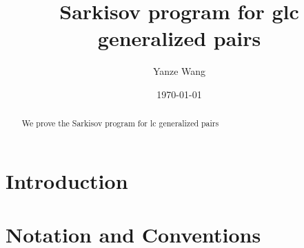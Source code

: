 \documentclass[11pt]{amsart}
\numberwithin{equation}{section}
\theoremstyle{definition}
\theoremstyle{definition}
\theoremstyle{definition}
\begin{document}
\title{Sarkisov program for glc generalized pairs}
\author{Yanze Wang}







\date{\today}

\begin{abstract}
We prove the Sarkisov program for lc generalized pairs
\end{abstract}


\maketitle
\tableofcontents

\section{Introduction}

\section{Notation and Conventions}
\end{document}
